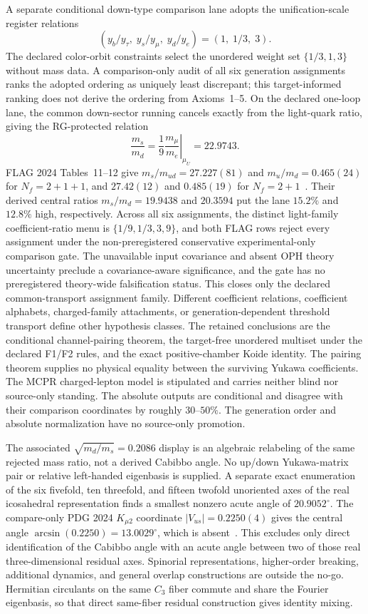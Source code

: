 \documentclass[11pt]{article}
\begin{document}
A separate conditional down-type comparison lane adopts the unification-scale register relations
\[
  (y_b/y_\tau,\;y_s/y_\mu,\;y_d/y_e)=(1,\;1/3,\;3).
\]
The declared color-orbit constraints select the unordered weight set
\(\{1/3,1,3\}\) without mass data.  A comparison-only audit of all six generation
assignments ranks the adopted ordering as uniquely least discrepant; this target-informed ranking does not derive
the ordering from Axioms~1--5.  On the declared one-loop lane, the common down-sector running
cancels exactly from the light-quark ratio, giving the RG-protected relation
\[
  \frac{m_s}{m_d}=\frac{1}{9}
  \left.\frac{m_\mu}{m_e}\right|_{\mu_U}=22.9743.
\]
FLAG 2024 Tables~11--12 give \(m_s/m_{ud}=27.227(81)\) and
\(m_u/m_d=0.465(24)\) for \(N_f=2+1+1\), and \(27.42(12)\) and \(0.485(19)\)
for \(N_f=2+1\)~\cite{flag2024}.  Their derived central ratios
\(m_s/m_d=19.9438\) and \(20.3594\) put the lane \(15.2\%\) and \(12.8\%\)
high, respectively.  Across all six assignments, the distinct light-family
coefficient-ratio menu is \(\{1/9,1/3,3,9\}\), and both FLAG rows reject every
assignment under the non-preregistered conservative experimental-only
comparison gate.  The unavailable input
covariance and absent OPH theory uncertainty preclude a covariance-aware significance, and the
gate has no preregistered theory-wide falsification status.  This closes only the declared
common-transport assignment family.  Different coefficient relations, coefficient alphabets,
charged-family attachments, or generation-dependent threshold transport define other hypothesis
classes.  The retained conclusions are the conditional channel-pairing theorem, the target-free
unordered multiset under the declared F1/F2 rules, and the exact positive-chamber Koide identity.
The pairing theorem supplies no physical equality between the surviving Yukawa coefficients.
The MCPR charged-lepton model is stipulated and carries neither blind nor
source-only standing.  The absolute outputs are conditional and disagree with their comparison
coordinates by roughly \(30\)--\(50\%\).  The generation order and absolute normalization have
no source-only promotion.

The associated \(\sqrt{m_d/m_s}=0.2086\) display is an algebraic relabeling
of the same rejected mass ratio, not a derived Cabibbo angle. No up/down
Yukawa-matrix pair or relative left-handed eigenbasis is supplied. A separate
exact enumeration of the six fivefold, ten threefold, and fifteen twofold
unoriented axes of the real icosahedral representation finds a smallest
nonzero acute angle of \(20.9052^\circ\). The compare-only PDG 2024
\(K_{\mu2}\) coordinate \(|V_{us}|=0.2250(4)\) gives the central angle
\(\arcsin(0.2250)=13.0029^\circ\), which is absent~\cite{pdg2024ckm}. This excludes only direct
identification of the Cabibbo angle with an acute angle between two of those
real three-dimensional residual axes. Spinorial representations, higher-order breaking,
additional dynamics, and general overlap constructions are outside the
no-go. Hermitian circulants on the same \(C_3\) fiber commute and share the
Fourier eigenbasis, so that direct same-fiber residual construction gives
identity mixing.
\end{document}
